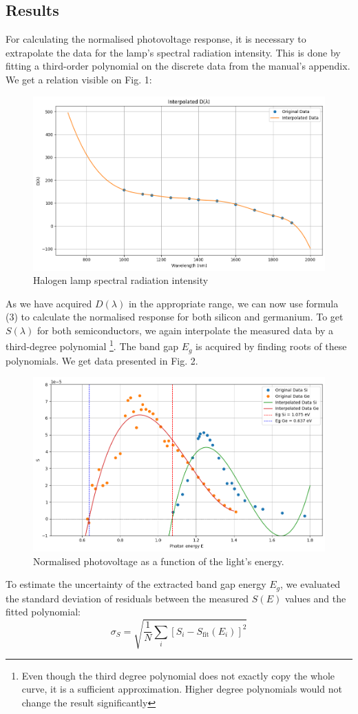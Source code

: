 \documentclass[english,11pt,a4paper]{article}
\begin{document}
\begin{multicols}{2}
		\section{Results}
		For calculating the normalised photovoltage response, it is necessary to extrapolate the data for the lamp's spectral radiation intensity. This is done by fitting a third-order polynomial on the discrete data from the manual's appendix. We get a relation visible on Fig. 1:
		
		\begin{figure}[H]
			\centering
			\includegraphics[width=0.9\linewidth]{D}
			\caption{Halogen lamp spectral radiation intensity}
			\label{fig:mereni}
		\end{figure}
		As we have acquired $D(\lambda)$ in the appropriate range, we can now use formula (3) to calculate the normalised response for both silicon and germanium. To get $S(\lambda)$ for both semiconductors, we again interpolate the measured data by a third-degree polynomial \footnote{Even though the third degree polynomial does not exactly copy the whole curve, it is a sufficient approximation. Higher degree polynomials would not change the result significantly}. The band gap $E_g$ is acquired by finding roots of these polynomials. We get data presented in Fig. 2.
		\begin{figure}[H]
			\centering
			\includegraphics[width=0.9\linewidth]{results}
			\caption{Normalised photovoltage as a function of the light's energy.}
			\label{fig:mereni}
		\end{figure}
		To estimate the uncertainty of the extracted band gap energy $E_g$, we evaluated the standard deviation of residuals between the measured $S(E)$ values and the fitted polynomial:
		\[
		\sigma_S = \sqrt{\frac{1}{N} \sum_i \left[S_i - S_\text{fit}(E_i)\right]^2}
		\]
		

\end{multicols}
\end{document}
